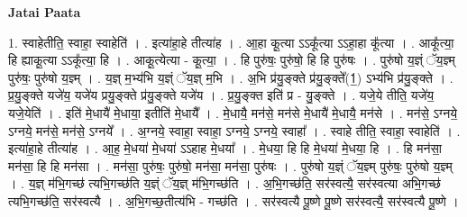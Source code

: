 \documentclass[17pt]{extarticle}
\begin{document}
\textbf{Jatai Paata} \newline

1. स्वाहेतीति॒ स्वाहा॒ स्वाहेति॑ । . इत्या॑हा॒हे तीत्या॑ह । . आ॒हा कू॒त्या ऽऽकू᳚त्या ऽऽहा॒हा कू᳚त्या । . आकू᳚त्या॒ हि ह्याकू॒त्या ऽऽकू᳚त्या॒ हि । . आकू॒त्येत्या - कू॒त्या॒ । . हि पुरु॑षः॒ पुरु॑षो॒ हि हि पुरु॑षः । . पुरु॑षो य॒ज्ञ्ं ॅय॒ज्ञ्म् पुरु॑षः॒ पुरु॑षो य॒ज्ञ्म् । . य॒ज्ञ् म॒भ्य॑भि य॒ज्ञ्ं ॅय॒ज्ञ् म॒भि । . अ॒भि प्र॑यु॒ङ्क्ते प्र॑यु॒ङ्क्ते᳚(1॒) ऽभ्य॑भि प्र॑यु॒ङ्क्ते । . प्र॒यु॒ङ्क्ते यजे॑य॒ यजे॑य प्रयु॒ङ्क्ते प्र॑यु॒ङ्क्ते यजे॑य । . प्र॒यु॒ङ्क्त इति॑ प्र - यु॒ङ्क्ते । . यजे॒ये तीति॒ यजे॑य॒ यजे॒येति॑ । . इति॑ मे॒धायै॑ मे॒धाया॒ इतीति॑ मे॒धायै᳚ । . मे॒धायै॒ मन॑से॒ मन॑से मे॒धायै॑ मे॒धायै॒ मन॑से । . मन॑से॒ ऽग्नये॒ ऽग्नये॒ मन॑से॒ मन॑से॒ ऽग्नये᳚ । . अ॒ग्नये॒ स्वाहा॒ स्वाहा॒ ऽग्नये॒ ऽग्नये॒ स्वाहा᳚ । . स्वाहे तीति॒ स्वाहा॒ स्वाहेति॑ । . इत्या॑हा॒हे तीत्या॑ह । . आ॒ह॒ मे॒धया॑ मे॒धया॑ ऽऽहाह मे॒धया᳚ । . मे॒धया॒ हि हि मे॒धया॑ मे॒धया॒ हि । . हि मन॑सा॒ मन॑सा॒ हि हि मन॑सा । . मन॑सा॒ पुरु॑षः॒ पुरु॑षो॒ मन॑सा॒ मन॑सा॒ पुरु॑षः । . पुरु॑षो य॒ज्ञ्ं ॅय॒ज्ञ्म् पुरु॑षः॒ पुरु॑षो य॒ज्ञ्म् । . य॒ज्ञ् म॑भि॒गच्छ॑ त्यभि॒गच्छ॑ति य॒ज्ञ्ं ॅय॒ज्ञ् म॑भि॒गच्छ॑ति । . अ॒भि॒गच्छ॑ति॒ सर॑स्वत्यै॒ सर॑स्वत्या अभि॒गच्छ॑ त्यभि॒गच्छ॑ति॒ सर॑स्वत्यै । . अ॒भि॒गच्छ॒तीत्य॑भि - गच्छ॑ति । . सर॑स्वत्यै पू॒ष्णे पू॒ष्णे सर॑स्वत्यै॒ सर॑स्वत्यै पू॒ष्णे । \newline
\end{document}
